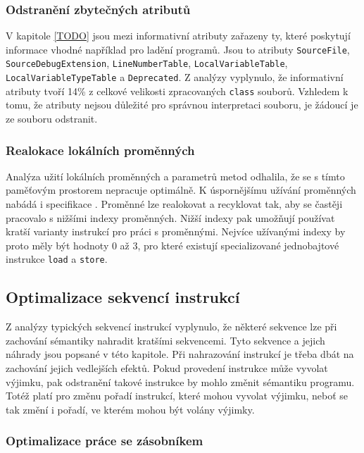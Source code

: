 
\subsubsection{Odstranění zbytečných atributů}
V kapitole \ref{TODO} jsou mezi informativní atributy zařazeny ty, které poskytují informace vhodné například pro ladění programů. Jsou to atributy \texttt{SourceFile}, \texttt{SourceDebugExtension}, \texttt{LineNumberTable}, \texttt{LocalVariableTable}, \texttt{LocalVariableTypeTable} a \texttt{Deprecated}.  Z analýzy vyplynulo, že informativní atributy tvoří 14\% z celkové velikosti zpracovaných \texttt{class} souborů. Vzhledem k tomu, že atributy nejsou důležité pro správnou interpretaci souboru, je žádoucí je ze souboru odstranit.

\subsubsection{Realokace lokálních proměnných}
Analýza užití lokálních proměnných a parametrů metod odhalila, že se s tímto paměťovým prostorem nepracuje optimálně. K úspornějšímu užívání proměnných nabádá i specifikace \cite{Lindholm:JVM}. Proměnné lze realokovat a recyklovat tak, aby se častěji pracovalo s nižšími indexy proměnných. Nižší indexy pak umožňují používat kratší varianty instrukcí pro práci s proměnnými. Nejvíce užívanými indexy by proto měly být hodnoty 0 až 3, pro které existují specializované jednobajtové instrukce \texttt{load} a \texttt{store}. 


\subsection{Optimalizace sekvencí instrukcí}

Z analýzy typických sekvencí instrukcí vyplynulo, že některé sekvence lze při zachování sémantiky nahradit kratšími sekvencemi.
Tyto sekvence a jejich náhrady jsou popsané v této kapitole.
Při nahrazování instrukcí je třeba dbát na zachování jejich vedlejších efektů. Pokud provedení instrukce může vyvolat výjimku, pak odstranění takové instrukce by mohlo změnit sémantiku programu. Totéž platí pro změnu pořadí instrukcí, které mohou vyvolat výjimku, neboť se tak změní i pořadí, ve kterém mohou být volány výjimky.

\subsubsection{Optimalizace práce se zásobníkem}

